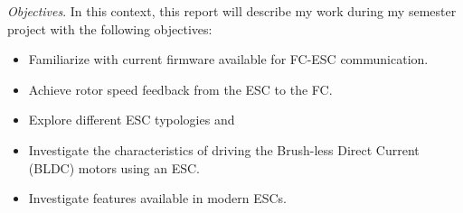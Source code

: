 \textit{Objectives}. In this context, this report will describe my work during my semester project with the following objectives:
\begin{itemize}
    \item Familiarize with current firmware available for FC-ESC communication.
    \item Achieve rotor speed feedback from the ESC to the FC.
    \item Explore different ESC typologies and 
    \item Investigate the characteristics of driving the Brush-less Direct Current (BLDC) motors using an ESC.
    \item Investigate features available in modern ESCs.
\end{itemize}